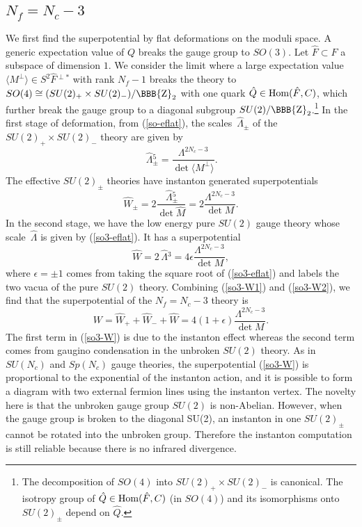 \documentclass[lecture]{qft-l}
\newcommand{\eps}{\epsilon}
\newcommand{\Lam}{\varLambda}
\newcommand{\ZZ}{{\mbox{\BBB{Z}}}}
\newcommand{\Hom}{{\rm Hom}}
\newcommand{\bra}{\langle}
\newcommand{\ket}{\rangle}
\newcommand{\hLam}{\,\hat{\!\Lam}{}}
\newcommand{\hF}{\hat{F}{}}
\newcommand{\hM}{\hat{M}{}}
\newcommand{\hQ}{\hat{Q}{}}
\newcommand{\Mperp}{\bra M^\perp\ket}
\def\Subhead#1{\subsection*{#1}}
\begin{document}
\Subhead{{\boldmath $N_f=N_c-3$}}

We first find the superpotential by flat deformations on the moduli space.
A generic expectation value of $Q$ breaks the gauge group to $SO(3)$.
Let $\hF\subset F$ a subspace of dimension $1$.
We consider the limit where a large expectation value 
$\Mperp\in S^2\hF^{\perp*}$ with rank $N_f-1$ breaks the theory to 
$SO(4)\cong(SU(2)_+\times SU(2)_-)/\ZZ_2$ 
with one quark $\hQ\in\Hom(\hF,C)$, which further break the gauge group 
to a diagonal subgroup $SU(2)/\ZZ_2$.\footnote{The decomposition 
of $SO(4)$ into $SU(2)_+\times SU(2)_-$ is canonical.
The isotropy group of $\hQ\in\Hom(\hF,C)$ (in $SO(4)$) and its isomorphisms 
onto $SU(2)_\pm$ depend on $\hQ$.}
In the first stage of deformation, from (\ref{so-eflat}), 
the scales $\hLam_\pm$ of the $SU(2)_+\times SU(2)_-$ theory are given by
	\begin{equation}
\hLam_\pm^5=\frac{\Lam^{2N_c-3}}{\det\Mperp}.
	\end{equation}
The effective $SU(2)_\pm$ theories have instanton generated superpotentials
	\begin{equation}\label{so3-W1}
\hat{W}_\pm=2\frac{\hLam_\pm^5}{\det\hM}=2\frac{\Lam^{2N_c-3}}{\det M}.
	\end{equation}
In the second stage, we have the low energy pure $SU(2)$ gauge theory whose
scale $\hLam$ is given by (\ref{so3-eflat}).
It has a superpotential
	\begin{equation}\label{so3-W2}
\hat{W}=2\hLam^3=4\eps\frac{\Lam^{2N_c-3}}{\det M},
	\end{equation}
where $\eps=\pm1$ comes from taking the square root of (\ref{so3-eflat})
and labels the two vacua of the pure $SU(2)$ theory.
Combining (\ref{so3-W1}) and (\ref{so3-W2}), we find that the superpotential 
of the $N_f=N_c-3$ theory is
	\begin{equation}\label{so3-W}
W=\hat{W}_++\hat{W}_-+\hat{W}=4(1+\eps)\frac{\Lam^{2N_c-3}}{\det M}.
	\end{equation}
The first term in (\ref{so3-W}) is due to the instanton effect
whereas the second term comes from gaugino condensation in the unbroken 
$SU(2)$ theory.
As in $SU(N_c)$ and $Sp(N_c)$ gauge theories, the superpotential (\ref{so3-W})
is proportional to the exponential of the instanton action, and it is possible
to form a diagram with two external fermion lines using the instanton vertex.
The novelty here is that the unbroken gauge group $SU(2)$ is non-Abelian.
However, when the gauge group is broken to the diagonal SU(2), an instanton
in one $SU(2)_\pm$ cannot be rotated into the unbroken group.
Therefore the instanton computation is still reliable because
there is no infrared divergence.
\end{document}
